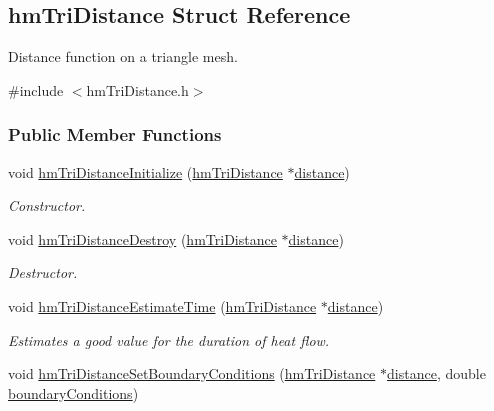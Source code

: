 \hypertarget{structhm_tri_distance}{\subsection{hm\-Tri\-Distance Struct Reference}
\label{structhm_tri_distance}
}


Distance function on a triangle mesh.  




{\ttfamily \#include $<$hm\-Tri\-Distance.\-h$>$}

\subsubsection*{Public Member Functions}
\begin{DoxyCompactItemize}
\item 
void \hyperlink{structhm_tri_distance_a8a899fd136486c1e60e30769bbae0261}{hm\-Tri\-Distance\-Initialize} (\hyperlink{structhm_tri_distance}{hm\-Tri\-Distance} $\ast$\hyperlink{structhm_tri_distance_a6a9fc819eb7899fe7efd9203a89ce059}{distance})
\begin{DoxyCompactList}\small\item\em Constructor. \end{DoxyCompactList}\item 
void \hyperlink{structhm_tri_distance_abd2454b513ff310597c08a72be5f2193}{hm\-Tri\-Distance\-Destroy} (\hyperlink{structhm_tri_distance}{hm\-Tri\-Distance} $\ast$\hyperlink{structhm_tri_distance_a6a9fc819eb7899fe7efd9203a89ce059}{distance})
\begin{DoxyCompactList}\small\item\em Destructor. \end{DoxyCompactList}\item 
void \hyperlink{structhm_tri_distance_ab8619d4051e27e72dc8c58b8863bde07}{hm\-Tri\-Distance\-Estimate\-Time} (\hyperlink{structhm_tri_distance}{hm\-Tri\-Distance} $\ast$\hyperlink{structhm_tri_distance_a6a9fc819eb7899fe7efd9203a89ce059}{distance})
\begin{DoxyCompactList}\small\item\em Estimates a good value for the duration of heat flow. \end{DoxyCompactList}\item 
void \hyperlink{structhm_tri_distance_af47ea95819dacb5bd20f0b1336097680}{hm\-Tri\-Distance\-Set\-Boundary\-Conditions} (\hyperlink{structhm_tri_distance}{hm\-Tri\-Distance} $\ast$\hyperlink{structhm_tri_distance_a6a9fc819eb7899fe7efd9203a89ce059}{distance}, double \hyperlink{structhm_tri_distance_ac4f3253165198d2d4e0cf5812cba22af}{boundary\-Conditions})

\end{DoxyCompactItemize}
